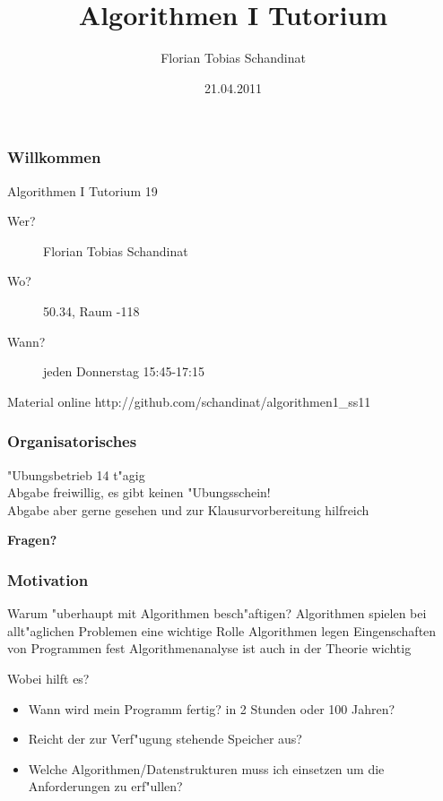 \documentclass{beamer}
\title{Algorithmen I Tutorium}
\author{Florian Tobias Schandinat}
\date{21.04.2011}
\institute{FTS}
\begin{document}
\begin{frame}
\frametitle{Willkommen}
\begin{block}{Algorithmen I Tutorium 19}
\begin{description}
\item[Wer?] Florian Tobias Schandinat\\
\item[Wo?] 50.34, Raum -118\\
\item[Wann?] jeden Donnerstag 15:45-17:15
\end{description}
\end{block}

\begin{block}{Material online}
http://github.com/schandinat/algorithmen1\_ss11
\end{block}
\end{frame}


\begin{frame}
\frametitle{Organisatorisches}
\begin{block}{"Ubungsbetrieb}
14 t"agig\\
Abgabe freiwillig, es gibt \alert{keinen} "Ubungsschein!\\
Abgabe aber gerne gesehen und zur Klausurvorbereitung hilfreich
\end{block}
\vspace{1cm}

\pause

\begin{center}
\textbf{\Huge Fragen?}
\end{center}
\end{frame}


\begin{frame}
\frametitle{Motivation}
\begin{alertblock}{Warum "uberhaupt mit Algorithmen besch"aftigen?}
Algorithmen spielen bei allt"aglichen Problemen eine wichtige Rolle
Algorithmen legen Eingenschaften von Programmen fest
Algorithmenanalyse ist auch in der Theorie wichtig
\end{alertblock}

\pause

\begin{block}{Wobei hilft es?}
\begin{itemize}
\item Wann wird mein Programm fertig? {\tiny in 2 Stunden oder 100 Jahren?}
\item Reicht der zur Verf"ugung stehende Speicher aus?
\item Welche Algorithmen/Datenstrukturen muss ich einsetzen um die Anforderungen zu erf"ullen?
\end{itemize}
\end{block}
\end{frame}
\end{document}
